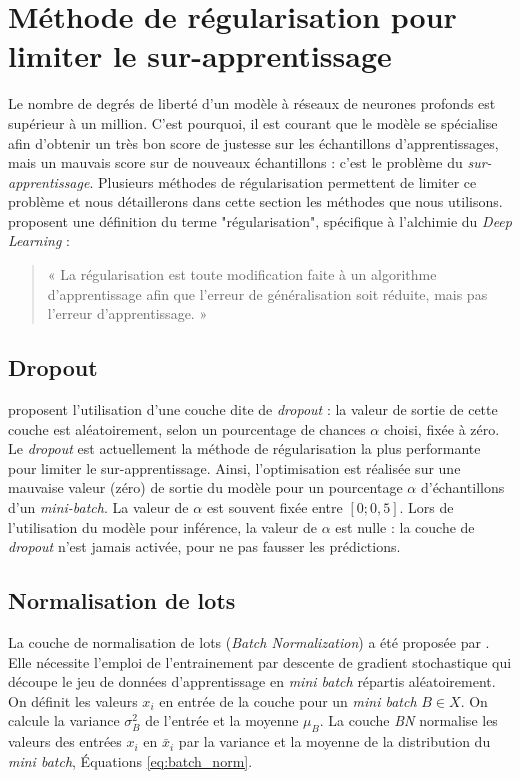 \section{Méthode de régularisation pour limiter le sur-apprentissage}
Le nombre de degrés de liberté d'un modèle à réseaux de neurones profonds est supérieur à un million.
C'est pourquoi, il est courant que le modèle se spécialise afin d'obtenir un très bon score de justesse sur les échantillons d'apprentissages, mais un mauvais score sur de nouveaux échantillons : c'est le problème du \emph{sur-apprentissage}.
Plusieurs méthodes de régularisation permettent de limiter ce problème et nous détaillerons dans cette section les méthodes que nous utilisons.
\citeauthor{goodfellow_deep_2016} proposent une définition du terme "régularisation", spécifique à l'alchimie du \textit{Deep Learning} \cite{goodfellow_deep_2016} :
\begin{quote}
	« La régularisation est toute modification faite à un algorithme d'apprentissage afin que l'erreur de généralisation soit réduite, mais pas l'erreur d'apprentissage. »
\end{quote}

\subsection{Dropout} \label{parag:dropout}
\citeauthor{srivastava_dropout_2014} \cite{srivastava_dropout_2014} proposent l'utilisation d'une couche dite de \textit{dropout} : la valeur de sortie de cette couche est aléatoirement, selon un pourcentage de chances $\alpha$ choisi, fixée à zéro. Le \textit{dropout} est actuellement la méthode de régularisation la plus performante pour limiter le sur-apprentissage.
Ainsi, l'optimisation est réalisée sur une mauvaise valeur (zéro) de sortie du modèle pour un pourcentage $\alpha$ d'échantillons d'un \textit{mini-batch}.
La valeur de $\alpha$ est souvent fixée entre $[0 ; 0,5]$.
Lors de l'utilisation du modèle pour inférence, la valeur de $\alpha$ est nulle : la couche de \textit{dropout} n'est jamais activée, pour ne pas fausser les prédictions.

\subsection{Normalisation de lots} \label{parag:batchnorm}
La couche de normalisation de lots (\textit{Batch Normalization}) a été proposée par \citeauthor{ioffe_batch_2015} \cite{ioffe_batch_2015}.
Elle nécessite l'emploi de l'entrainement par descente de gradient stochastique qui découpe le jeu de données d'apprentissage en \textit{mini batch} répartis aléatoirement.
On définit les valeurs $x_i$ en entrée de la couche pour un \textit{mini batch} $B \in X$.
On calcule la variance $\sigma_B^2$ de l'entrée et la moyenne $\mu_B$.
La couche \textit{BN} normalise les valeurs des entrées $x_i$ en $\bar{x}_{i}$ par la variance et la moyenne de la distribution du \textit{mini batch}, Équations \ref{eq:batch_norm}.

